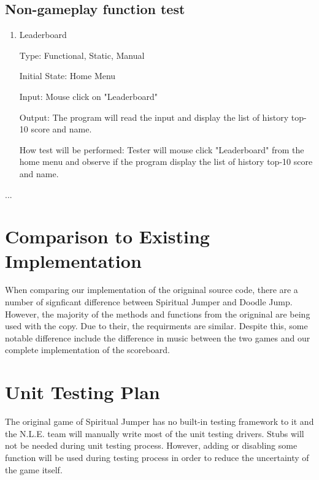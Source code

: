 \documentclass[12pt, titlepage]{article}
\begin{document}
\subsection{Non-gameplay function test}

\begin{enumerate}

\item{Leaderboard\\}

Type: Functional, Static, Manual
					
Initial State: Home Menu
					
Input: Mouse click on "Leaderboard"
					
Output: The program will read the input and display the list of history top-10 score and name.
					
How test will be performed: Tester will mouse click "Leaderboard" from the home menu and observe if the program display the list of history top-10 score and name.

\end{enumerate}
...

	
\section{Comparison to Existing Implementation}	

When comparing our implementation of the origninal source code, there are a number of signficant difference between Spiritual Jumper and Doodle Jump. However, the majority of the methods and functions from the origninal are being used with the copy. Due to their, the requirments are similar. Despite this, some notable difference include the difference in music between the two games and our complete implementation of the scoreboard. 
				
\section{Unit Testing Plan}
The original game of Spiritual Jumper has no built-in testing framework to it and the N.L.E. team will manually write most of the unit testing drivers. Stubs will not be needed during unit testing process. However, adding or disabling some function will be used during testing process in order to reduce the uncertainty of the game itself.
\end{document}
